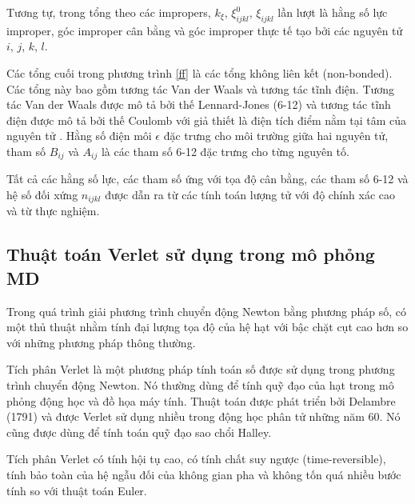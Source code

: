\documentclass[12pt,a4paper,reqno, oneside]{book}
\begin{document}
		Tương tự, trong tổng theo các impropers, $k_{\xi}$, $\xi^{0}_{ijkl}$, $\xi_{ijkl}$ lần lượt là hằng số lực improper, góc improper cân bằng và góc improper thực tế tạo bởi các nguyên tử $i$, $j$, $k$, $l$.
		
		Các tổng cuối trong phương trình \eqref{ff} là các tổng không liên kết (non-bonded). Các tổng này bao gồm tương tác Van der Waals và tương tác tĩnh điện. Tương tác Van der Waals được mô tả bởi thế Lennard-Jones (6-12) và tương tác tĩnh điện được mô tả bởi thế Coulomb với giả thiết là điện tích điểm nằm tại tâm của nguyên tử \cite{Ponder2003}. Hằng số điện môi $\epsilon$ đặc trưng cho môi trường giữa hai nguyên tử, tham số $B_{ij}$ và $A_{ij}$ là các tham số 6-12 đặc trưng cho từng nguyên tố.
		
		Tất cả các hằng số lực, các tham số ứng với tọa độ cân bằng, các tham số 6-12 và hệ số đối xứng $n_{ijkl}$ được dẫn ra từ các tính toán lượng tử với độ chính xác cao và từ thực nghiệm\cite{Ponder2003}.

	\subsection{Thuật toán Verlet sử dụng trong mô phỏng MD}
	\label{verlet}
		Trong quá trình giải phương trình chuyển động Newton bằng phương pháp số, có một thủ thuật nhằm tính đại lượng tọa độ của hệ hạt với bậc chặt cụt cao hơn so với những phương pháp thông thường.
		
		Tích phân Verlet\cite{Verlet1967} là một phương pháp tính toán số được sử dụng trong phương trình chuyển động Newton. Nó thường dùng để tính quỹ đạo của hạt trong mô phỏng động học và đồ họa máy tính. Thuật toán được phát triển bởi Delambre (1791) và được Verlet sử dụng nhiều trong động học phân tử những năm 60. Nó cũng được dùng để tính toán quỹ đạo sao chổi Halley.
			
		Tích phân Verlet có tính hội tụ cao, có tính chất suy ngược (time-reversible), tính bảo toàn của hệ ngẫu đối của không gian pha và không tốn quá nhiều bước tính so với thuật toán Euler.
			
\end{document}
